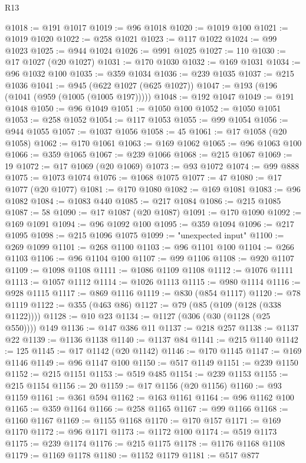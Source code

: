 \begin{lexlean}{R13}
\begin{coremodule}
@1018 := @191 @1017
@1019 := @96 @1018
@1020 := @1019 @100
@1021 := @1019 @1020
@1022 := @258 @1021
@1023 := @117 @1022
@1024 := @99 @1023
@1025 := @944 @1024
@1026 := @991 @1025
@1027 := 110
@1030 := @17 @1027 (@20 @1027)
@1031 := @170 @1030
@1032 := @169 @1031
@1034 := @96 @1032 @100
@1035 := @359 @1034
@1036 := @239 @1035
@1037 := @215 @1036
@1041 := @945 (@622 @1027 (@625 @1027))
@1047 := @193 (@196 (@1041 (@959 (@1005 (@1005 @197)))))
@1048 := @192 @1047
@1049 := @191 @1048
@1050 := @96 @1049
@1051 := @1050 @100
@1052 := @1050 @1051
@1053 := @258 @1052
@1054 := @117 @1053
@1055 := @99 @1054
@1056 := @944 @1055
@1057 := @1037 @1056
@1058 := 45
@1061 := @17 @1058 (@20 @1058)
@1062 := @170 @1061
@1063 := @169 @1062
@1065 := @96 @1063 @100
@1066 := @359 @1065
@1067 := @239 @1066
@1068 := @215 @1067
@1069 := 19
@1072 := @17 @1069 (@20 @1069)
@1073 := @93 @1072
@1074 := @99 @888
@1075 := @1073 @1074
@1076 := @1068 @1075
@1077 := 47
@1080 := @17 @1077 (@20 @1077)
@1081 := @170 @1080
@1082 := @169 @1081
@1083 := @96 @1082
@1084 := @1083 @440
@1085 := @217 @1084
@1086 := @215 @1085
@1087 := 58
@1090 := @17 @1087 (@20 @1087)
@1091 := @170 @1090
@1092 := @169 @1091
@1094 := @96 @1092 @100
@1095 := @359 @1094
@1096 := @217 @1095
@1098 := @215 @1096 @1075
@1099 := "unexpected input"
@1100 := @269 @1099
@1101 := @268 @1100
@1103 := @96 @1101 @100
@1104 := @266 @1103
@1106 := @96 @1104 @100
@1107 := @99 @1106
@1108 := @920 @1107
@1109 := @1098 @1108
@1111 := @1086 @1109 @1108
@1112 := @1076 @1111
@1113 := @1057 @1112
@1114 := @1026 @1113
@1115 := @980 @1114
@1116 := @928 @1115
@1117 := @869 @1116
@1119 := @830 (@854 @1117)
@1120 := @78 @1119
@1122 := @355 (@463 @86)
@1127 := @79 (@85 (@109 (@128 (@338 @1122))))
@1128 := @10 @23
@1134 := @1127 (@306 (@30 (@1128 (@25 @550)))) @149
@1136 := @147 @386 @11
@1137 := @218 @257
@1138 := @1137 @22
@1139 := @1136 @1138
@1140 := @1137 @84
@1141 := @215 @1140
@1142 := 125
@1145 := @17 @1142 (@20 @1142)
@1146 := @170 @1145
@1147 := @169 @1146
@1149 := @96 @1147 @100
@1150 := @517 @1149
@1151 := @239 @1150
@1152 := @215 @1151
@1153 := @519 @485
@1154 := @239 @1153
@1155 := @215 @1154
@1156 := 20
@1159 := @17 @1156 (@20 @1156)
@1160 := @93 @1159
@1161 := @361 @594
@1162 := @163 @1161
@1164 := @96 @1162 @100
@1165 := @359 @1164
@1166 := @258 @1165
@1167 := @99 @1166
@1168 := @1160 @1167
@1169 := @1155 @1168
@1170 := @170 @157
@1171 := @169 @1170
@1172 := @96 @1171
@1173 := @1172 @100
@1174 := @519 @1173
@1175 := @239 @1174
@1176 := @215 @1175
@1178 := @1176 @1168 @1108
@1179 := @1169 @1178
@1180 := @1152 @1179
@1181 := @517 @877

\end{coremodule}
\end{lexlean}
